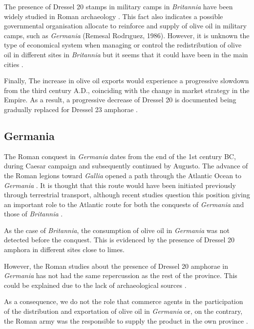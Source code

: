 \documentclass[review]{elsarticle}
\begin{document}
The presence of Dressel 20 stamps in military camps in \textit{Britannia} have been widely studied in Roman archaeology \citep{carreras_britannia_1998}. This fact also indicates a possible governmental organisation allocate to reinforce and supply of olive oil in military camps, such as \textit{Germania} (Remesal Rodrıguez, 1986). However, it is unknown the type of economical system when managing or control the redistribution of olive oil in different sites in \textit{Britannia} but it seems that it could have been in the main cities \citep[45]{funari_economic_2005}.

Finally, The increase in olive oil exports would experience a progressive slowdown from the third century A.D., coinciding with the change in market strategy in the Empire. As a result, a progressive decrease of Dressel 20 is documented being gradually replaced for Dressel 23 amphorae \citep{rodriguez1991aceite,millet_anforas_1998}.


\subsection{Germania}

The Roman conquest in \textit{Germania} dates from the end of the 1st century BC, during Caesar campaign and subsequently continued by Augusto. The advance of the Roman legions toward \textit{Gallia} opened a path through the Atlantic Ocean to \textit{Germania} \citep{remesal_annona_1986,
remesal_baetica_2002}. It is thought that this route would have been initiated previously through terrestrial transport, although recent studies question this position giving an important role to the Atlantic route for both the conquests of \textit{Germania} and those of \textit{Britannia} \citep{remesal_germn_2010,rubio-campillo_ecology_2018}.

As the case of \textit{Britannia}, the consumption of olive oil in \textit{Germania} was not detected before the conquest. This is evidenced by the presence of Dressel 20 amphora in different sites close to limes. 

However, the Roman studies about the presence of Dressel 20 amphorae in \textit{Germania} has not had the same repercussion as the rest of the province. This could be explained due to the lack of archaeological sources \citep{horacio2010llegada}.
  
As a consequence, we do not the role that commerce agents in the participation of the distribution and exportation of olive oil in \textit{Germania} or, on the contrary, the Roman army was the responsible to supply the product in the own province \citep[156]{remesal_germn_2010}. 
\end{document}
